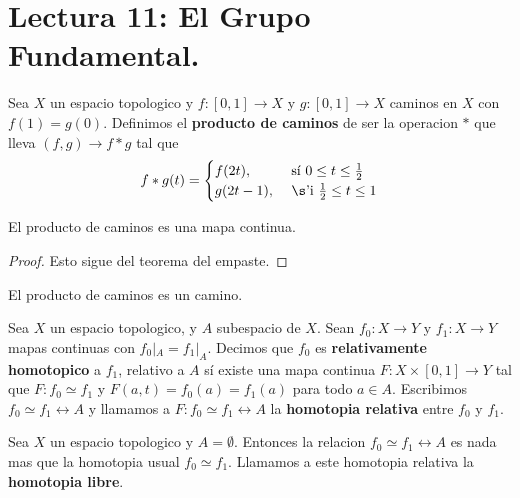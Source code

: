 \section*{Lectura 11: El Grupo Fundamental.}

\begin{definition}
    Sea $X$ un espacio topologico y  $f:[0,1] \xrightarrow{} X$ y $g:[0,1]
    \xrightarrow{} X$ caminos en $X$ con  $f(1)=g(0)$. Definimos el
    \textbf{producto de caminos} de ser la operacion $\ast$ que lleva  $(f,g)
    \xrightarrow{} f \ast g$ tal que
    \begin{equation*}
        f \ast g(t)=\begin{cases}
                f(2t), & \text{ s\'i } 0 \leq t \leq \frac{1}{2}    \\
                g(2t-1), & \text{ \s'i } \frac{1}{2} \leq t \leq 1  \\
            \end{cases}
    \end{equation*}
\end{definition}

\begin{lemma}\label{11.31}
    El producto de caminos es una mapa continua.
\end{lemma}
\begin{proof}
    Esto sigue del teorema del empaste.
\end{proof}
\begin{corollary}
    El producto de caminos es un camino.
\end{corollary}

\begin{definition}
    Sea $X$ un espacio topologico, y  $A$ subespacio de  $X$. Sean  $f_0:X
    \xrightarrow{} Y$ y $f_1:X \xrightarrow{} Y$ mapas continuas con
    $f_0|_A=f_1|_A$. Decimos que $f_0$ es \textbf{relativamente homotopico} a
    $f_1$, relativo a $A$ s\'i existe una mapa continua $F:X \times [0,1]
    \xrightarrow{} Y$ tal que $F:f_0 \simeq f_1$ y $F(a,t)=f_0(a)=f_1(a)$ para
    todo $a \in A$. Escribimos  $f_0 \simeq f_1 \rel{A}$ y llamamos a $F:f_0
    \simeq f_1 \rel{A}$ la \textbf{homotopia relativa} entre $f_0$ y $f_1$.
\end{definition}

\begin{example}\label{}
    Sea $X$ un espacio topologico y  $A=\emptyset$. Entonces la relacion  $f_0
    \simeq f_1 \rel{A}$ es nada mas que la homotopia usual $f_0 \simeq f_1$.
    Llamamos a este homotopia relativa la \textbf{homotopia libre}.
\end{example}

